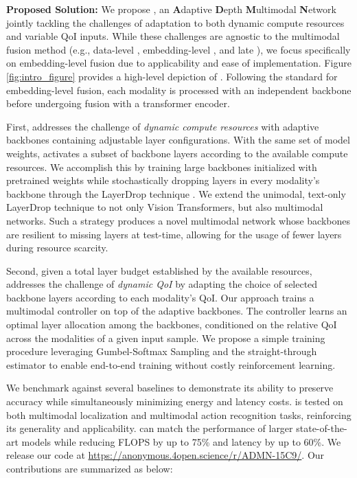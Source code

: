 \textbf{Proposed Solution:}
We propose \name, an \textbf{A}daptive \textbf{D}epth \textbf{M}ultimodal \textbf{N}etwork jointly tackling the challenges of adaptation to both dynamic compute resources and variable QoI inputs. While these challenges are agnostic to the multimodal fusion method (e.g., data-level \cite{kim2021vilt}, embedding-level \cite{jeong2024gdtm}, and late \cite{samplawski2023heteroskedastic}), we focus specifically on embedding-level fusion due to applicability and ease of implementation. Figure \ref{fig:intro_figure} provides a high-level depiction of \name. Following the standard for embedding-level fusion, each modality is processed with an independent backbone before undergoing fusion with a transformer encoder. 

First, \name addresses the challenge of \emph{dynamic compute resources} with adaptive backbones containing adjustable layer configurations. With the same set of model weights, \name activates a subset of backbone layers according to the available compute resources. We accomplish this by training large backbones initialized with pretrained weights while stochastically dropping layers in every modality's backbone through the LayerDrop technique \cite{fan2019reducing}. We extend the unimodal, text-only LayerDrop technique to not only Vision Transformers, but also multimodal networks. Such a strategy produces a novel multimodal network whose backbones are resilient to missing layers at test-time, allowing for the usage of fewer layers during resource scarcity. 

Second, given a total layer budget established by the available resources, \name addresses the challenge of \emph{dynamic QoI} by adapting the choice of selected backbone layers according to each modality's QoI. Our approach trains a multimodal controller on top of the adaptive backbones. The controller learns an optimal layer allocation among the backbones, conditioned on the relative QoI across the modalities of a given input sample. We propose a simple training procedure leveraging Gumbel-Softmax Sampling \cite{maddison2016gumbel} and the straight-through estimator \cite{bengio2013estimating} to enable end-to-end training without costly reinforcement learning. 

We benchmark \name against several baselines to demonstrate its ability to preserve accuracy while simultaneously minimizing energy and latency costs. \name is tested on both multimodal localization and multimodal action recognition tasks, reinforcing its generality and applicability. \name can match the performance of larger state-of-the-art models while reducing FLOPS by up to 75\% and latency by up to 60\%. We release our code at \url{https://anonymous.4open.science/r/ADMN-15C9/}. Our contributions are summarized as below:


